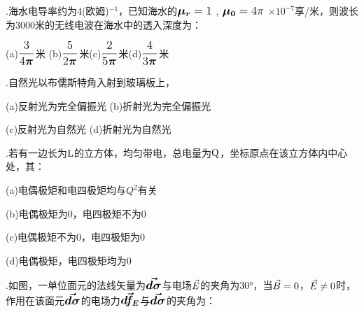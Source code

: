 .\hspace{0.8em}海水电导率约为4(欧姆)$^{-1}$，已知海水的$\large{\boldsymbol{\mu_r}}= 1$ , $\large{\boldsymbol{\mu_0}}= 4\large{\pi}$ $ \times 10^{-7} $享/米，则波长为3000米的无线电波在海水中的透入深度为：

\vspace{0.3cm}
(a)\hspace{0.6em}$\displaystyle{ \frac{ 3 }{4 \large{\boldsymbol{\pi}} } }$米 \hspace{1.6em}(b)\hspace{0.6em}$\displaystyle{ \frac{ 5 }{ 2 \large{\boldsymbol{\pi}}} }$米\hspace{1.6em}(c)\hspace{0.6em}$\displaystyle{ \frac{ 2 }{ 5 \large{\boldsymbol{\pi}}} }$米\hspace{1.6em}(d)\hspace{0.6em}$\displaystyle{ \frac{ 4 }{ 3 \large{\boldsymbol{\pi}}} }$米
\vspace{0.3cm}

.\hspace{0.8em}自然光以布儒斯特角入射到玻璃板上，
\vspace{0.2cm}

(a)\hspace{0.6em}反射光为完全偏振光\hspace{4.5em} (b)\hspace{0.6em}折射光为完全偏振光

(c)\hspace{0.6em}反射光为自然光\hspace{6.6em} (d)\hspace{0.6em}折射光为自然光
\vspace{0.2cm}

.\hspace{0.8em}若有一边长为$\rm{L}$的立方体，均匀带电，总电量为$\rm{Q}$，坐标原点在该立方体内中心处，其：
\vspace{0.2cm}

(a)\hspace{0.6em}电偶极矩和电四极矩均与$Q^2$有关

(b)\hspace{0.6em}电偶极矩为0，电四极矩不为0

(c)\hspace{0.6em}电偶极矩不为0，电四极矩为0

(d)\hspace{0.6em}电偶极矩，电四极矩均为0

\newpage
{}.\hspace{0.8em}如图，一单位面元的法线矢量为$\large{\boldsymbol{\Vec{d\sigma}}}$与电场$\large{ {\Vec{E}}}$的夹角为$\ang{30}$，当$\large{ {\Vec{B}}}=0$，$\large{ {\Vec{E}}} \neq 0$时，作用在该面元$\large{\boldsymbol{\Vec{d\sigma}}}$的电场力$\large{\boldsymbol{\Vec{df_E}}}$与$\large{\boldsymbol{\Vec{d\sigma}}}$的夹角为：\vspace{0.2cm}

